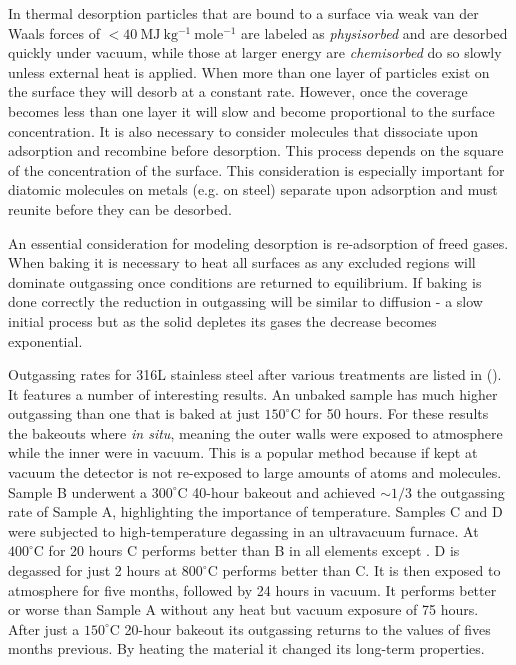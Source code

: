In thermal desorption particles that are bound to a surface via weak van der Waals forces of
$< 40\ \mathrm{MJ\ kg^{-1}\ mole^{-1}}$ are labeled
as \textit{physisorbed} and are desorbed quickly under vacuum, while those at larger energy are \textit{chemisorbed} do so slowly unless
external heat is applied.  When more than one layer of particles exist on the surface they will desorb at a constant rate.  However, once
the coverage becomes less than one layer it will slow and become proportional to the surface concentration.  It is also necessary to
consider molecules that dissociate upon adsorption and recombine before desorption.  This process depends on the square of the
concentration
of the surface.  This consideration is especially important for diatomic molecules on metals (e.g.  on steel) separate upon
adsorption and must reunite before they can be desorbed.

An essential consideration for modeling desorption is re-adsorption of freed gases.  When baking it is necessary to heat all surfaces as
any excluded regions will dominate outgassing once conditions are returned to equilibrium.  If baking is done correctly the reduction in
outgassing will be similar to diffusion - a slow initial process but as the solid depletes its gases the decrease becomes
exponential.

Outgassing rates for 316L stainless steel after various treatments are listed in
 ().  It features a number of interesting
results.  An unbaked sample has
much higher outgassing than one that is baked at just $150^{\circ}\mathrm{C}$ for 50 hours.  For these results the bakeouts where
\textit{in situ}, meaning the outer walls were exposed to atmosphere while the inner were in vacuum.  This is a popular method because
if kept at vacuum the detector is not re-exposed to large amounts of atoms and molecules.  Sample B underwent a $300^{\circ}\mathrm{C}$
40-hour bakeout and achieved ${\sim} 1/3$ the outgassing rate of Sample A, highlighting the importance of temperature.  Samples C and D
were subjected to high-temperature degassing in an ultravacuum furnace.  At $400^{\circ}\mathrm{C}$ for 20 hours C performs better than B
in all elements except .  D is degassed for just 2 hours at $800^{\circ}\mathrm{C}$ performs better than C.  It is then exposed
to atmosphere for five months, followed by 24 hours in vacuum.  It performs better or worse than Sample A without any heat but vacuum
exposure of 75 hours.  After just a $150^{\circ}\mathrm{C}$ 20-hour bakeout its outgassing returns to the values of fives months
previous.  By heating the material it changed its long-term properties.

